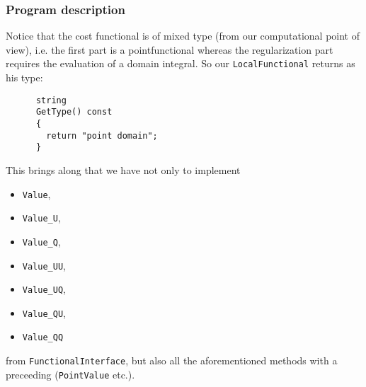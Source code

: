 \subsubsection{Program description}
Notice that the cost functional is of mixed type (from our computational point of view), i.e. the first part is a pointfunctional whereas the regularization part requires the evaluation of a domain integral. So our \texttt{LocalFunctional} returns as his type:
\begin{verbatim}
      string
      GetType() const
      {
        return "point domain";
      }
\end{verbatim}
This brings along that we have not only to implement 
\begin{itemize} 
\item \texttt{Value},
\item  \texttt{Value\_U},
\item \texttt{Value\_Q}, 
\item \texttt{Value\_UU},
\item \texttt{Value\_UQ},
\item \texttt{Value\_QU},
\item \texttt{Value\_QQ}
\end{itemize}
 from \texttt{FunctionalInterface}, but also all the aforementioned methods with a preceeding  (\texttt{PointValue} etc.).
